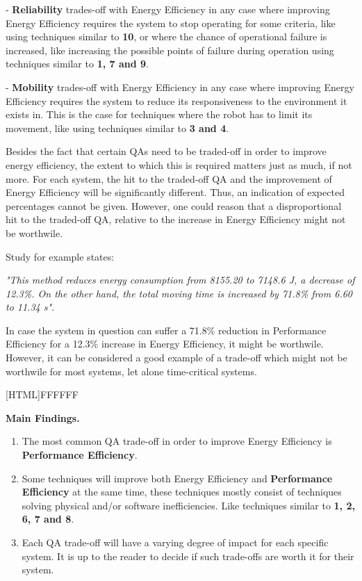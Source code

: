 - \textbf{Reliability} trades-off with Energy Efficiency in any case where improving Energy Efficiency requires the system to 
stop operating for some criteria, like using techniques similar to \textbf{10}, or where the chance of operational failure is increased, 
like increasing the possible points of failure during operation using techniques similar to \textbf{1, 7 and 9}. 

\vspace{2mm}

- \textbf{Mobility} trades-off with Energy Efficiency in any case where improving Energy Efficiency requires the system to reduce its responsiveness to 
the environment it exists in. This is the case for techniques where the robot has to limit its movement, like using techniques similar to \textbf{3 and 4}.

\vspace{2mm}

Besides the fact that certain QAs need to be traded-off in order to improve energy efficiency, the extent to which this is required 
matters just as much, if not more.
For each system, the hit to the traded-off QA and the improvement of Energy Efficiency will be significantly different.
Thus, an indication of expected percentages cannot be given.
However, one could reason that a disproportional hit to the traded-off QA, relative to the increase in Energy Efficiency might not be worthwile.

\vspace{2mm}

Study \cite{kaitwanidvilai2020industrial_robot_cycle_time} for example states: 

\noindent\textit{"This method reduces energy consumption from 8155.20 to 7148.6 J, 
a decrease of 12.3\%. On the other hand, the total moving time is increased by 71.8\% from 6.60 to 11.34 s".}

\vspace{2mm}

In case the system in question can suffer a 71.8\% reduction in Performance Efficiency for a 12.3\% increase in Energy Efficiency, it might be worthwile.
However, it can be considered a good example of a trade-off which might not be worthwile for most systems, let alone time-critical systems.

\vspace{5mm}

\noindent{}[HTML]{FFFFFF}{\parbox{0.47\textwidth}{%
\noindent \textbf{Main Findings.}
\begin{enumerate}[nolistsep]
\item The most common QA trade-off in order to improve Energy Efficiency is \textbf{Performance Efficiency}.
\item Some techniques will improve both Energy Efficiency and \textbf{Performance Efficiency} at the same time, 
these techniques mostly consist of techniques solving physical and/or software inefficiencies.
Like techniques similar to \textbf{1, 2, 6, 7 and 8}.
\item Each QA trade-off will have a varying degree of impact for each specific system. 
It is up to the reader to decide if such trade-offs are worth it for their system.
\end{enumerate}}}
